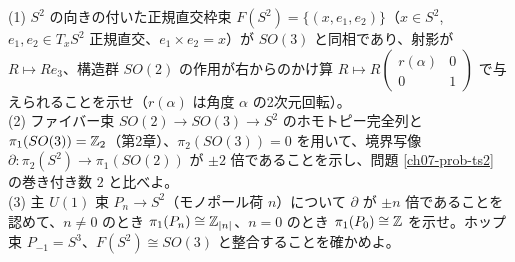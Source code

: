 \begin{problem}[難易度 C]\label{ch07-prob-frame}
(1) $S^2$ の向きの付いた正規直交枠束 $F(S^2)=\{(x,e_1,e_2)\}$（$x\in S^2$, $e_1,e_2\in T_xS^2$ 正規直交、$e_1\times e_2=x$）が $SO(3)$ と同相であり、射影が $R\mapsto Re_3$、構造群 $SO(2)$ の作用が右からのかけ算 $R\mapsto R\begin{pmatrix}r(\alpha)&0\\0&1\end{pmatrix}$ で与えられることを示せ（$r(\alpha)$ は角度 $\alpha$ の2次元回転）。\\
(2) ファイバー束 $SO(2)\to SO(3)\to S^2$ のホモトピー完全列と $\pi_1(SO(3))=\mathbb{Z}_2$（第2章）、$\pi_2(SO(3))=0$ を用いて、境界写像 $\partial\colon\pi_2(S^2)\to\pi_1(SO(2))$ が $\pm2$ 倍であることを示し、問題 \ref{ch07-prob-ts2} の巻き付き数 $2$ と比べよ。\\
(3) 主 $U(1)$ 束 $P_n\to S^2$（モノポール荷 $n$）について $\partial$ が $\pm n$ 倍であることを認めて、$n\neq0$ のとき $\pi_1(P_n)\cong\mathbb{Z}_{\lvert n\rvert}$、$n=0$ のとき $\pi_1(P_0)\cong\mathbb{Z}$ を示せ。ホップ束 $P_{-1}=S^3$、$F(S^2)\cong SO(3)$ と整合することを確かめよ。
\end{problem}

